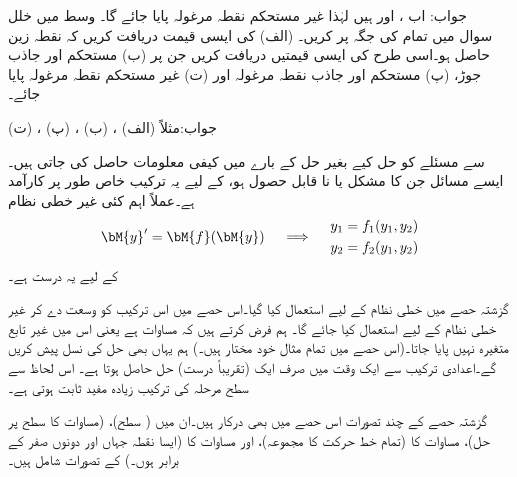 جواب: اب ،  اور  ہیں لہٰذا غیر مستحکم نقطہ مرغولہ پایا جائے گا۔
 \quad وسط میں خلل\\
سوال  میں تمام  کی جگہ  پر کریں۔ (الف)  کی ایسی قیمت دریافت کریں کہ نقطہ زین حاصل ہو۔اسی طرح  کی ایسی قیمتیں دریافت کریں جن پر (ب) مستحکم اور جاذب جوڑ، (پ) مستحکم اور جاذب نقطہ مرغولہ اور (ت) غیر مستحکم نقطہ مرغولہ پایا جائے۔

جواب:مثلاً (الف) ، (ب) ، (پ) ، (ت) 

 سے مسئلے کو حل کیے بغیر حل کے بارے میں کیفی معلومات حاصل کی جاتی ہیں۔ایسے مسائل جن کا  مشکل یا نا قابل حصول ہو، کے لیے یہ ترکیب خاص طور پر کارآمد ہے۔عملاً اہم کئی غیر خطی نظام
\begin{gather}\label{مساوات_نظام_غیر_خطی_ترکیب_مرحلہ_الف}
\begin{aligned}
\bM{y}'=\bM{f}(\bM{y})
\end{aligned}\quad \implies \quad 
\begin{aligned}
y_1&=f_1(y_1,y_2)\\
y_2&=f_2(y_1,y_2)
\end{aligned}
\end{gather}
کے لیے یہ درست ہے۔

گزشتہ حصے میں  خطی نظام کے لیے استعمال کیا گیا۔اس حصے میں اس ترکیب کو وسعت دے کر غیر خطی نظام کے لیے استعمال کیا جائے گا۔ ہم فرض کرتے ہیں کہ مساوات   ہے یعنی اس میں غیر تابع متغیرہ   نہیں پایا جاتا۔(اس حصے میں تمام مثال خود مختار ہیں۔) ہم یہاں بھی حل کی نسل پیش کریں گے۔اعدادی ترکیب سے ایک وقت میں صرف ایک (تقریباً درست) حل حاصل ہوتا ہے۔ اس لحاظ سے سطح مرحلہ کی ترکیب زیادہ مفید ثابت ہوتی ہے۔

گزشتہ حصے کے چند تصورات اس حصے میں بھی درکار ہیں۔ان میں  ( سطح)،  (مساوات  کا  سطح پر حل)، مساوات  کا  (تمام خط حرکت کا مجموعہ)،  اور مساوات  کا  (ایسا نقطہ  جہاں  اور  دونوں صفر کے برابر ہوں۔) کے تصورات شامل ہیں۔

